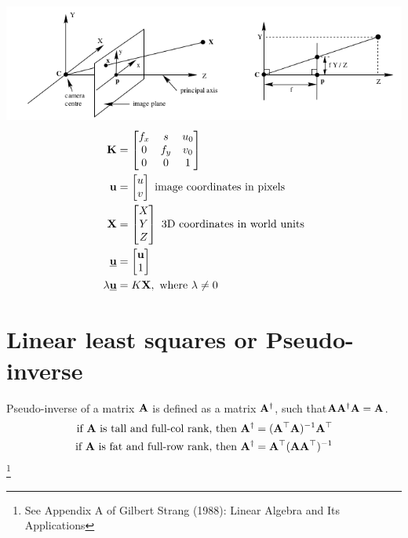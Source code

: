 \documentclass[twocolumn]{article}
\begin{document}
\includegraphics[width=\linewidth]{media/pinhole-camera-model-2.png}
\newcommand{\ubfu}{\underline{\bfu}}
\newcommand{\ubfX}{\underline{\bfX}}
\begin{align}
  \bfK &= \begin{bmatrix}
    f_x & s & u_0 \\
    0 & f_y & v_0 \\
    0 & 0 & 1 \\
  \end{bmatrix}
  \\
  \bfu &= \begin{bmatrix} u   \\ v \end{bmatrix} \text{ image coordinates in pixels} \\
  \bfX &= \begin{bmatrix} X   \\  Y   \\ Z\end{bmatrix} \text{ 3D coordinates in world units}\\
  \ubfu &= \begin{bmatrix} \bfu \\   1\end{bmatrix} \\
  \lambda \ubfu &= K \bfX, \text{ where } \lambda \ne 0
\end{align}
\section{Linear least squares  or  Pseudo-inverse}

Pseudo-inverse of a matrix  $\mathbf{A}$ is defined   as a matrix $\mathbf{A}^\dagger$, such
that$\mathbf{A} \mathbf{A}^\dagger \mathbf{A} =  \mathbf{A}$.
\begin{align}
  \text{if } \mathbf{A} \text{ is tall and full-col rank, then } \mathbf{A}^\dagger &= (\mathbf{A}^\top \mathbf{A})^{-1} \mathbf{A}^\top \\
  \text{if } \mathbf{A} \text{ is fat and full-row rank, then } \mathbf{A}^\dagger &=  \mathbf{A}^\top (\mathbf{A} \mathbf{A}^\top)^{-1}
\end{align}\footnote{See Appendix A of Gilbert Strang (1988): Linear Algebra
  and Its Applications}
\end{document}
